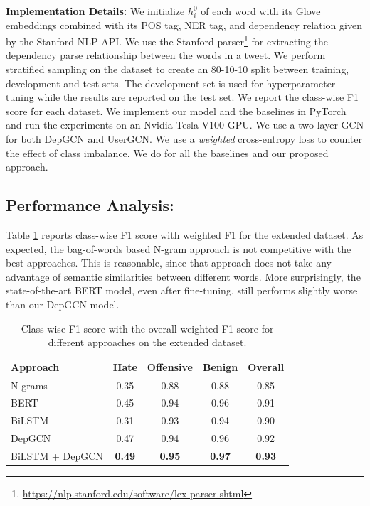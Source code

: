 \noindent
\textbf{Implementation Details:}
We initialize $h_i^0$ of each word with its Glove embeddings \cite{glove} combined with its POS tag, NER tag, and dependency relation given by the Stanford NLP API. We use the Stanford parser\footnote{\url{https://nlp.stanford.edu/software/lex-parser.shtml}} for extracting the dependency parse relationship between the words in a tweet. We perform stratified sampling on the dataset to create an 80-10-10 split
between training, development and test sets. The development set is used for hyperparameter tuning while the results are reported on the test set. We report the class-wise F1 score for each dataset. We implement our model and the baselines in PyTorch and run the experiments on an Nvidia Tesla V100 GPU. We use a two-layer GCN for both DepGCN and UserGCN. We use a \emph{weighted} cross-entropy loss to counter the effect of class imbalance.
We do for all the baselines and our proposed approach.

\subsection{Performance Analysis:}

Table \ref{tab:davidsonext} reports class-wise F1 score with weighted F1 for the \citet{davidson2017automated} extended dataset. As expected, the bag-of-words based N-gram approach
is not competitive with the best approaches. This is reasonable, since that approach
does not take any advantage of semantic similarities between different words.
More surprisingly, the state-of-the-art BERT model, even after fine-tuning, still performs slightly worse than our DepGCN model.

\begin{table}[tbh]
  \centering
  \small
\begin{tabular}{ l | c c  c c }
\toprule %
 Approach &  Hate & Offensive & Benign & Overall \\ %
  \midrule
 N-grams & 0.35 & 0.88 & 0.88 & 0.85\\
 BERT & 0.45 & 0.94 & 0.96 & 0.91\\
 BiLSTM & 0.31 & 0.93 & 0.94 & 0.90\\
 DepGCN & 0.47 & 0.94 & 0.96 & 0.92\\
 BiLSTM + DepGCN & \textbf{0.49} & \textbf{0.95} & \textbf{0.97} & \textbf{0.93}\\
 \bottomrule %
\end{tabular}
\caption{\label{tab:davidsonext} Class-wise F1 score with the overall weighted F1 score for different approaches on the \citet{davidson2017automated} extended dataset.}
\end{table}

